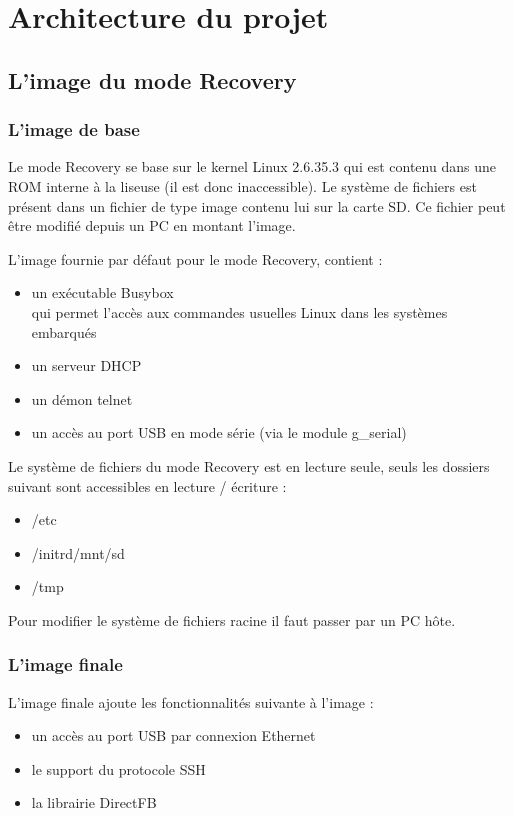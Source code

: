 \chapter{Architecture du projet}

\section{L'image du mode Recovery}

\subsection{L'image de base}
Le mode Recovery se base sur le kernel Linux 2.6.35.3 qui est contenu dans une ROM interne à la liseuse (il est donc inaccessible). Le système de fichiers est présent dans un fichier de type image contenu lui sur la carte SD. Ce fichier peut être modifié depuis un PC en montant l'image.

L'image fournie par défaut pour le mode Recovery, contient : 
\begin{itemize}
	\item un exécutable Busybox \\
		qui permet l'accès aux commandes usuelles Linux dans les systèmes embarqués
	\item un serveur DHCP
	\item un démon telnet
	\item un accès au port USB en mode série (via le module g_serial)
\end{itemize}


Le système de fichiers du mode Recovery est en lecture seule, seuls les dossiers suivant sont accessibles en lecture / écriture : 
\begin{itemize}
	\item /etc
	\item /initrd/mnt/sd
	\item /tmp
\end{itemize}

Pour modifier le système de fichiers racine il faut passer par un PC hôte.

\subsection{L'image finale}

L'image finale ajoute les fonctionnalités suivante à l'image : 
	\begin{itemize}
		\item un accès au port USB par connexion Ethernet
		\item le support du protocole SSH
		\item la librairie DirectFB
	\end{itemize}

